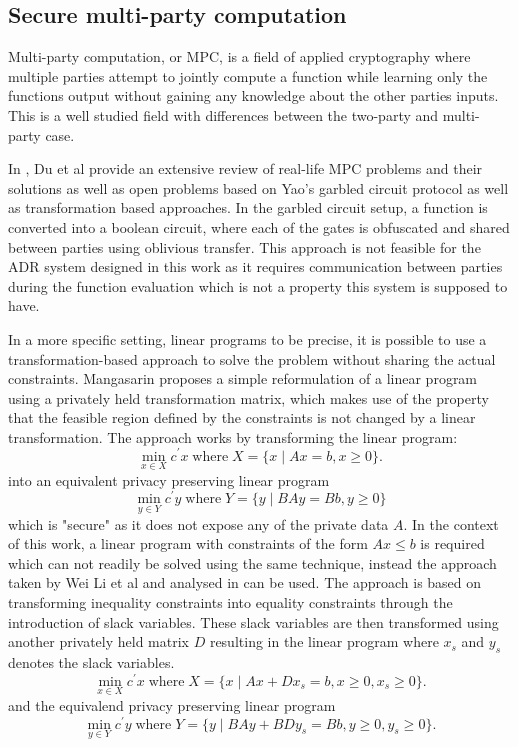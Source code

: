 \documentclass[12pt,msc,a4paper,oneside]{ucl_thesis}
\begin{document}
\subsection{Secure multi-party computation}
Multi-party computation, or MPC, is a field of applied cryptography where multiple parties attempt to jointly compute a function while learning only the functions output without gaining any knowledge about the other parties inputs. This is a well studied field with differences between the two-party and multi-party case. \cite{goldreich1998secure}

In \cite{du2001secure}, Du et al provide an extensive review of real-life MPC problems and their solutions as well as open problems based on Yao's garbled circuit protocol \cite{yao1982protocols} as well as transformation based approaches. In the garbled circuit setup, a function is converted into a boolean circuit, where each of the gates is obfuscated and shared between parties using oblivious transfer. This approach is not feasible for the ADR system designed in this work as it requires communication between parties during the function evaluation which is not a property this system is supposed to have.

In a more specific setting, linear programs to be precise, it is possible to use a transformation-based approach to solve the problem without sharing the actual constraints. Mangasarin \cite{Mangasarian2012} proposes a simple reformulation of a linear program using a privately held transformation matrix, which makes use of the property that the feasible region defined by the constraints is not changed by a linear transformation. The approach works by transforming the linear program:
\begin{equation}
    \min_{x\in X}c^\prime x \;\textrm{where}\; X = \{x \mid Ax=b, x\geq0\}.
\end{equation}
into an equivalent privacy preserving linear program
\begin{equation}
    \min_{y\in Y}c^\prime y \;\textrm{where}\; Y = \{y \mid BAy=Bb, y\geq0\}
\end{equation}
which is "secure" as it does not expose any of the private data $A$. In the context of this work, a linear program with constraints of the form $Ax\leq b$ is required which can not readily be solved using the same technique, instead the approach taken by Wei Li et al \cite{Li2013} and analysed in \cite{vaidya2009privacy} can be used. The approach is based on transforming inequality constraints into equality constraints through the introduction of slack variables. These slack variables are then transformed using another privately held matrix $D$ resulting in the linear program where $x_s$ and $y_s$ denotes the slack variables.
\begin{equation}
    \min_{x\in X}c^\prime x \;\textrm{where}\; X = \{x \mid Ax + Dx_s = b, x\geq0, x_s\geq0\}.
\end{equation}
and the equivalend privacy preserving linear program
\begin{equation}
    \min_{y\in Y}c^\prime y \;\textrm{where}\; Y = \{y \mid BAy + BDy_s = Bb, y\geq0, y_s\geq0\}.
\end{equation}
\end{document}
